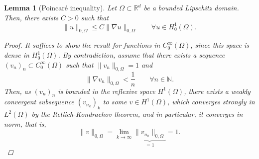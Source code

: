 \documentclass{article}
\newcommand{\R}{\mathbb{R}}
\newtheorem{lemma}{Lemma}
\begin{document}
\begin{lemma}[Poincaré inequality] Let $\Omega\subset \R^d$ be a bounded Lipschitz domain. Then, there exists $C>0$ such that
    \begin{equation*}
        \|u\|_{0,\Omega} \leq C\|\nabla u\|_{0,\Omega} \qquad \forall u\in H^1_0(\Omega).
    \end{equation*}
    \begin{proof}
        It suffices to show the result for functions in $C_0^\infty(\Omega)$, since this space is dense in $H_0^1(\Omega)$. By contradiction, assume that there exists a sequence $(v_n)_n\subset C_0^\infty(\Omega)$ such that $\|v_n\|_{0,\Omega}=1$ and 
        $$\|\nabla v_n\|_{0,\Omega} < \frac{1}{n} \qquad \forall n\in \mathbb{N}.$$
        Then, as $(v_n)_n$ is bounded in the reflexive space $H^1(\Omega)$, there exists a weakly convergent subsequence $(v_{n_k})_k$ to some $v\in H^1(\Omega)$, which converges strongly in $L^2(\Omega)$ by the Rellich-Kondrachov theorem, and in particular, it converges in norm, that is,
        $$\|v\|_{0,\Omega} = \lim_{k\to\infty} \underbrace{\|v_{n_k}\|_{0,\Omega}}_{=1} = 1.$$
        

\end{proof}
\end{lemma}
\end{document}
